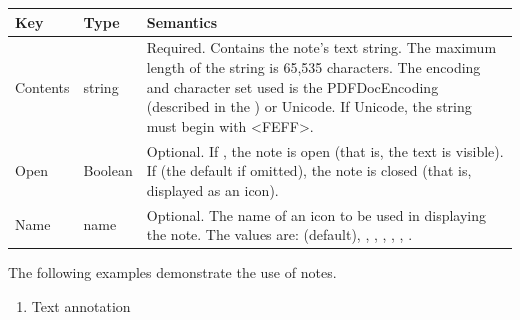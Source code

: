 \documentclass[letterpaper,12pt,english,openany,oneside]{sphinxmanual}
\begin{document}


\begin{savenotes}\sphinxattablestart
\centering
{}\label{\detokenize{pdfmark_Basic:section-3}}\nobreak
\begin{tabulary}{\linewidth}[t]{|T|T|T|}
\hline
\sphinxstyletheadfamily 
Key
&\sphinxstyletheadfamily 
Type
&\sphinxstyletheadfamily 
Semantics
\\
\hline
Contents
&
string
&
Required. Contains the note’s text string. The maximum length of the  string is 65,535 characters. The encoding and character set used is the PDFDocEncoding (described in the  ) or Unicode. If Unicode, the string must begin with <FEFF>.
\\
\hline
Open
&
Boolean
&
Optional. If  , the note is open (that is, the text is visible). If  (the default if omitted), the note is closed (that is, displayed as an icon).
\\
\hline
Name
&
name
&
Optional. The name of an icon to be used in displaying the note. The values are:  (default),  ,  ,  ,  ,  ,  .
\\
\hline
\end{tabulary}
\par
\sphinxattableend\end{savenotes}

The following examples demonstrate the use of notes.
\begin{enumerate}
%
\item {} 
Text annotation

\end{enumerate}
\end{document}
